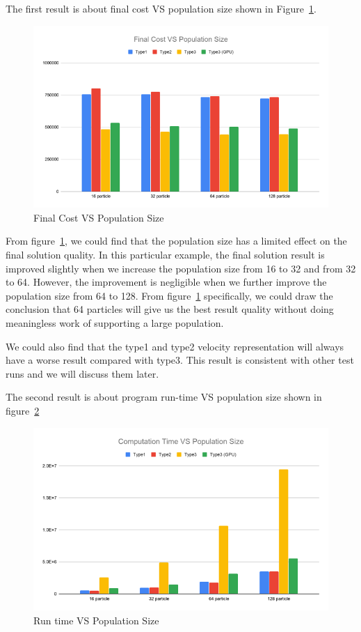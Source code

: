 \documentclass{article}
\begin{document}
The first result is about final cost VS population size shown in Figure~\ref{fig:FVP}.
\begin{figure}[H]
\centering
\includegraphics[width=1\linewidth]{CostVSPopulation.png}
\caption{Final Cost VS Population Size}
\label{fig:FVP}
\end{figure}

From figure~\ref{fig:FVP}, we could find that the population size has a limited effect on the final solution quality. In this particular example, the final solution result is improved slightly when we increase the population size from 16 to 32 and from 32 to 64. However, the improvement is negligible when we further improve the population size from 64 to 128. From figure~\ref{fig:FVP} specifically, we could draw the conclusion that 64 particles will give us the best result quality without doing meaningless work of supporting a large population.

We could also find that the type1 and type2 velocity representation will always have a worse result compared with type3. This result is consistent with other test runs and we will discuss them later.

The second result is about program run-time VS population size shown in figure~\ref{fig:TVP}
\begin{figure}[H]
\centering
\includegraphics[width=1\linewidth]{TimeVSPopulation.png}
\caption{Run time VS Population Size}
\label{fig:TVP}
\end{figure}
\end{document}
